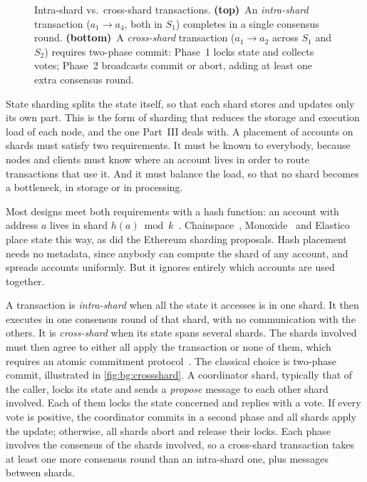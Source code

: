 \begin{figure}[t]
	\centering
	
	\caption{Intra-shard vs.\ cross-shard transactions.
		\textbf{(top)}~An \emph{intra-shard} transaction ($a_1 \to a_4$, both in $S_1$) completes in a single consensus round.
		\textbf{(bottom)}~A \emph{cross-shard} transaction ($a_1 \to a_2$ across $S_1$ and $S_2$) requires two-phase commit: Phase~1 locks state and collects votes; Phase~2 broadcasts commit or abort, adding at least one extra consensus round.}
	\label{fig:bg:crossshard}
\end{figure}

State sharding splits the state itself, so that each shard stores and updates only its own part.
This is the form of sharding that reduces the storage and execution load of each node, and the one Part~III deals with.
A placement of accounts on shards must satisfy two requirements.
It must be known to everybody, because nodes and clients must know where an account lives in order to route transactions that use it.
And it must balance the load, so that no shard becomes a bottleneck, in storage or in processing.

Most designs meet both requirements with a hash function: an account with address $a$ lives in shard $h(a) \bmod k$~\cite{al2024sok}.
Chainspace~\cite{albassam2018chainspace}, Monoxide~\cite{wang2019monoxide} and Elastico~\cite{elastico} place state this way, as did the Ethereum sharding proposals.  
Hash placement needs no metadata, since anybody can compute the shard of any account, and spreads accounts uniformly.
But it ignores entirely which accounts are used together.

A transaction is \emph{intra-shard} when all the state it accesses is in one shard.
It then executes in one consensus round of that shard, with no communication with the others.
It is \emph{cross-shard} when its state spans several shards.
The shards involved must then agree to either all apply the transaction or none of them, which requires an atomic commitment protocol~\cite{adhikari2025transaction}.
The classical choice is two-phase commit, illustrated in \autoref{fig:bg:crossshard}.
A coordinator shard, typically that of the caller, locks its state and sends a \emph{propose} message to each other shard involved.
Each of them locks the state concerned and replies with a vote.
If every vote is positive, the coordinator commits in a second phase and all shards apply the update; otherwise, all shards abort and release their locks.
Each phase involves the consensus of the shards involved, so a cross-shard transaction takes at least one more consensus round than an intra-shard one, plus messages between shards.

